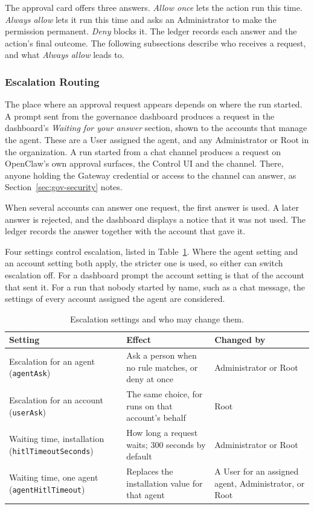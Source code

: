 The approval card offers three answers. \textit{Allow once} lets the
action run this time. \textit{Always allow} lets it run this time and asks
an Administrator to make the permission permanent. \textit{Deny} blocks
it. The ledger records each answer and the action's final outcome. The
following subsections describe who receives a request, and what
\textit{Always allow} leads to.

\subsubsection{Escalation Routing}
\label{sec:gov-escalation-routing}

The place where an approval request appears depends on where the run
started. A prompt sent from the governance dashboard produces a request in
the dashboard's \textit{Waiting for your answer} section, shown to the
accounts that manage the agent. These are a User assigned the agent, and
any Administrator or Root in the organization. A run started from a chat
channel produces a request on OpenClaw's own approval surfaces, the Control
UI and the channel. There, anyone holding the Gateway credential or access
to the channel can answer, as Section~\ref{sec:gov-security} notes.

When several accounts can answer one request, the first answer is used. A
later answer is rejected, and the dashboard displays a notice that it was
not used. The ledger records the answer together with the account that
gave it.

Four settings control escalation, listed in
Table~\ref{tab:gov-escalation-settings}. Where the agent setting and an
account setting both apply, the stricter one is used, so either can switch
escalation off. For a dashboard prompt the account setting is that of the
account that sent it. For a run that nobody started by name, such as a chat
message, the settings of every account assigned the agent are considered.

\begin{table}[htbp]
\centering
\caption{Escalation settings and who may change them.}
\label{tab:gov-escalation-settings}
\small
\begin{tabularx}{\textwidth}{@{}>{\raggedright\arraybackslash}p{}>{\raggedright\arraybackslash}X>{\raggedright\arraybackslash}p{}@{}}
\toprule
\textbf{Setting} & \textbf{Effect} & \textbf{Changed by} \\
\midrule
Escalation for an agent (\texttt{agentAsk}) & Ask a person when no rule
matches, or deny at once & Administrator or Root \\
Escalation for an account (\texttt{userAsk}) & The same choice, for runs
on that account's behalf & Root \\
Waiting time, installation (\texttt{hitlTimeoutSeconds}) & How long a
request waits; 300 seconds by default & Administrator or Root \\
Waiting time, one agent (\texttt{agentHitlTimeout}) & Replaces the
installation value for that agent & A User for an assigned agent,
Administrator, or Root \\
\bottomrule
\end{tabularx}
\end{table}

